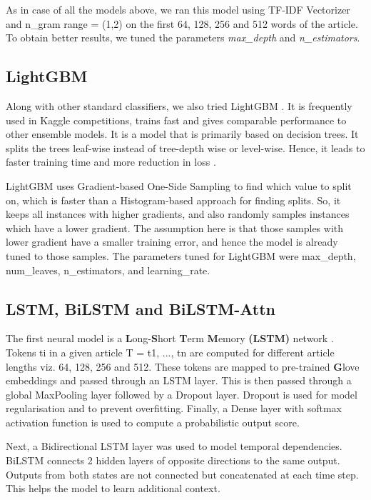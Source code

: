 \documentclass[11pt]{article}
\begin{document}
\medskip

As in case of all the models above, we ran this model using TF-IDF Vectorizer and n\_gram range = (1,2) on the first 64, 128, 256 and 512 words of the article. To obtain better results, we tuned the parameters \textit{max\_depth} and \textit{n\_estimators}.


\subsection{LightGBM}

Along with other standard classifiers, we also tried LightGBM \cite{ke2017lightgbm}. It is frequently used in Kaggle competitions, trains fast and gives comparable performance to other ensemble models. It is a model that is primarily based on decision trees. It splits the trees leaf-wise instead of tree-depth wise or level-wise. Hence, it leads to faster training time and more reduction in loss \cite{al2019comparison}.

LightGBM uses Gradient-based One-Side Sampling to find which value to split on, which is faster than a Histogram-based approach for finding splits. So, it keeps all instances with higher gradients, and also randomly samples instances which have a lower gradient. The assumption here is that those samples with lower gradient have a smaller training error, and hence the model is already tuned to those samples. The parameters tuned for LightGBM were max\_depth, num\_leaves, n\_estimators, and learning\_rate.

\subsection{LSTM, BiLSTM and BiLSTM-Attn}

The first neural model is a \textbf{L}ong-\textbf{S}hort \textbf{T}erm \textbf{M}emory \textbf{(LSTM)} network \cite{hochreiter1997long}. Tokens ti in a given article T = {t1, ..., tn} are computed for different article lengths viz. 64, 128, 256 and 512. These tokens are mapped to pre-trained \textbf{G}love \cite{pennington2014glove} embeddings and passed through an LSTM layer. This is then passed through a global MaxPooling layer followed by a Dropout layer. Dropout is used for model regularisation and to prevent overfitting. Finally, a Dense layer with softmax activation function is used to compute a probabilistic output score.

Next, a Bidirectional LSTM \cite{schuster1997bidirectional} layer was used to model temporal dependencies. BiLSTM connects 2 hidden layers of opposite directions to the same output. Outputs from both states are not connected but concatenated at each time step. This helps the model to learn additional context.
\end{document}
